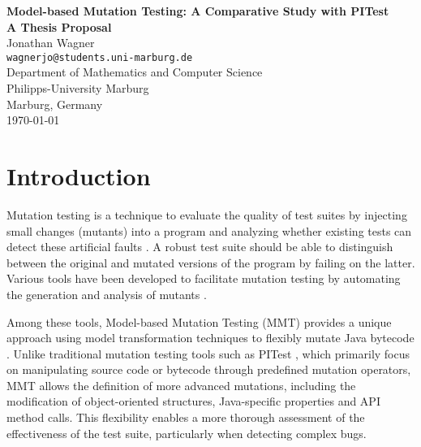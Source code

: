 \documentclass[12pt,a4paper]{article}
\begin{document}
\begin{titlepage}
\centering
\vspace*{2cm}

{\Huge\textbf{Model-based Mutation Testing: A Comparative Study with PITest}}\\[1.5cm]

{\Large\textbf{A Thesis Proposal}}\\[2cm]

{\Large Jonathan Wagner}\\[0.5cm]
{\large \texttt{wagnerjo@students.uni-marburg.de}}\\[1.5cm]

{\large Department of Mathematics and Computer Science}\\[0.3cm]
{\large Philipps-University Marburg}\\[0.3cm]
{\large Marburg, Germany}\\[2cm]

{\large \today}

\vfill
\end{titlepage}

\tableofcontents
\newpage

\section{Introduction}
Mutation testing is a technique to evaluate the quality of test suites by
injecting small changes (mutants) into a program and analyzing whether existing
tests can detect these artificial faults \cite{offutt_mutation_2001}. A robust
test suite should be able to distinguish between the original and mutated
versions of the program by failing on the latter. Various tools have been
developed to facilitate mutation testing by automating the generation and
analysis of mutants \cite{coles_pit_2016}.

Among these tools, Model-based Mutation Testing (MMT) provides a unique
approach using model transformation techniques to flexibly mutate Java bytecode
\cite{bockisch_mmt_2024, bockisch_mutation_2024}. Unlike traditional mutation
testing tools such as PITest \cite{coles_pit_2016}, which primarily focus on
manipulating source code or bytecode through predefined mutation operators,
MMT allows the definition of more advanced mutations, including the
modification of object-oriented structures, Java-specific properties and API
method calls. This flexibility enables a more thorough assessment of the
effectiveness of the test suite, particularly when detecting complex bugs.
\end{document}
